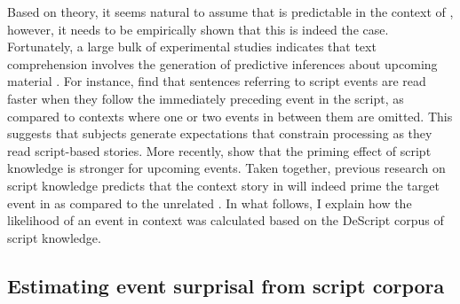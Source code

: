 Based on  theory, it seems natural to assume that \Last[e] is predictable in  the context of \Last[a--d], however, it needs to be empirically shown that this is indeed the case. Fortunately, a large bulk of experimental studies indicates that text comprehension involves the generation of predictive inferences about upcoming material \citep[see e.g.][]{bower.etal1979, mckoon.ratcliff1986, vandenbroek1994, vandermeer.etal2002, nuthmann.vandermeer2005,camblin.etal2007, otten.vanberkum2007, hare.etal2009, bicknell.etal2010, matsuki.etal2011,metusalem.etal2012, delogu.etal2018}. For instance, \citet{bower.etal1979} find that sentences referring to script events are read faster when they follow the immediately preceding event in the script, as compared to contexts where one or two events in between them are omitted. This suggests that subjects generate expectations that constrain processing as they read script-based stories. More recently, \citet{vandermeer.etal2002} show that the priming effect of script knowledge is stronger for upcoming events. Taken together, previous research on script knowledge predicts that the context story in \Last[a--d] will indeed prime the target event in \Last[e] as compared to the unrelated \Last[f]. In what follows, I explain how the likelihood of an event in context was calculated based on the DeScript corpus of script knowledge.

\subsection{Estimating event surprisal from script corpora}
\label{sec:infotheory-script-event-chains}

